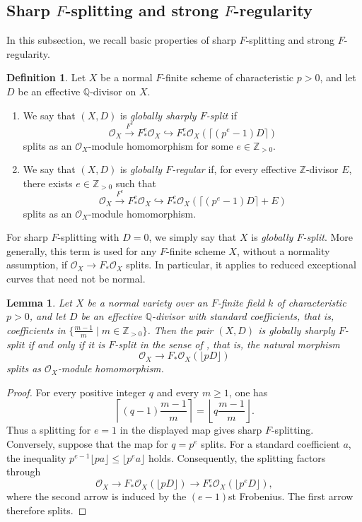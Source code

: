 \documentclass[12pt]{amsart}
\newcommand{\Q}{\mathbb{Q}}
\newcommand{\Z}{\mathbb{Z}}
\newcommand{\sO}{\mathcal{O}}
\theoremstyle{plain}
\newtheorem{lem}[thm]{Lemma}
\theoremstyle{definition}
\newtheorem{defn}[thm]{Definition}
\theoremstyle{remark}
\newtheorem{defn and notation}[thm]{Definition and Notation}
\theoremstyle{plain}
\numberwithin{equation}{thm}
\begin{document}
\subsection{Sharp \texorpdfstring{$F$}{F}-splitting and strong \texorpdfstring{$F$}{F}-regularity}

In this subsection, we recall basic properties of sharp $F$-splitting and strong $F$-regularity.

\begin{defn}\label{def:GFS and GFR}
Let $X$ be a normal $F$-finite scheme of characteristic $p>0$, and let $D$ be an effective $\Q$-divisor on $X$. 
\begin{enumerate}
\item[\textup{(1)}] We say that $(X, D)$ is {\em globally sharply $F$-split} if 
\[
\sO_X \xrightarrow{F^e} F_*^e\sO_X \hookrightarrow F_*^e\sO_X( \lceil(p^e-1)D \rceil)
\]
splits as an $\sO_X$-module homomorphism for some $e \in \Z_{>0}$. 
 
\item[\textup{(2)}] 
We say that $(X, D)$ is {\em globally $F$-regular} 
if, for every effective $\Z$-divisor $E$, there exists $e \in \Z_{>0}$ such that 
\[
\sO_X \xrightarrow{F^e} F_*^e\sO_X \hookrightarrow 
F_*^e\sO_X( \lceil(p^e-1)D \rceil +E)
\]
splits as an $\sO_X$-module homomorphism. 
\end{enumerate}
\end{defn}

For sharp $F$-splitting with $D=0$, we simply say that $X$ is \emph{globally $F$-split}.
More generally, this term is used for any $F$-finite scheme $X$, without a normality assumption, if $\sO_X\to F_*\sO_X$ splits.
In particular, it applies to reduced exceptional curves that need not be normal.

\begin{lem}\label{lem:sharply or not}
    Let $X$ be a normal variety over an $F$-finite field $k$ of characteristic $p>0$, and let $D$ be an effective $\Q$-divisor with standard coefficients, that is, coefficients in $\{\frac{m-1}{m}\mid m\in\Z_{>0}\}$.
    Then the pair $(X,D)$ is globally sharply $F$-split if and only if it is $F$-split in the sense of \cite[Definition 2.4]{Hara(two-dim)}, that is, the natural morphism
    \[
    \sO_X \to F_{*}\sO_X(\lfloor pD \rfloor)
    \]
    splits as $\sO_X$-module homomorphism.
\end{lem}

\begin{proof}
For every positive integer $q$ and every $m\geq 1$, one has
\[
\left\lceil(q-1)\frac{m-1}{m}\right\rceil
=\left\lfloor q\frac{m-1}{m}\right\rfloor.
\]
Thus a splitting for $e=1$ in the displayed map gives sharp $F$-splitting.
Conversely, suppose that the map for $q=p^e$ splits.
For a standard coefficient $a$, the inequality
$p^{e-1}\lfloor pa\rfloor\leq\lfloor p^ea\rfloor$ holds.
Consequently, the splitting factors through
\[
\sO_X\longrightarrow F_*\sO_X(\lfloor pD\rfloor)
\longrightarrow F_*^e\sO_X(\lfloor p^eD\rfloor),
\]
where the second arrow is induced by the $(e-1)$st Frobenius.
The first arrow therefore splits.
\end{proof}
\end{document}
